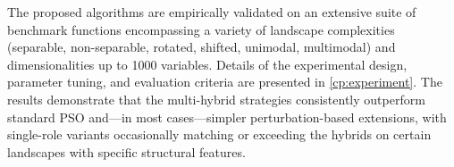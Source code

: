 {The proposed algorithms are empirically validated on an extensive suite of benchmark functions encompassing a variety of landscape complexities (separable, non-separable, rotated, shifted, unimodal, multimodal) and dimensionalities up to 1000 variables. Details of the experimental design, parameter tuning, and evaluation criteria are presented in \autoref{cp:experiment}.
The results demonstrate that the multi-hybrid strategies consistently outperform standard PSO and---in most cases---simpler perturbation-based extensions, with single-role variants occasionally matching or exceeding the hybrids on certain landscapes with specific structural features.



}